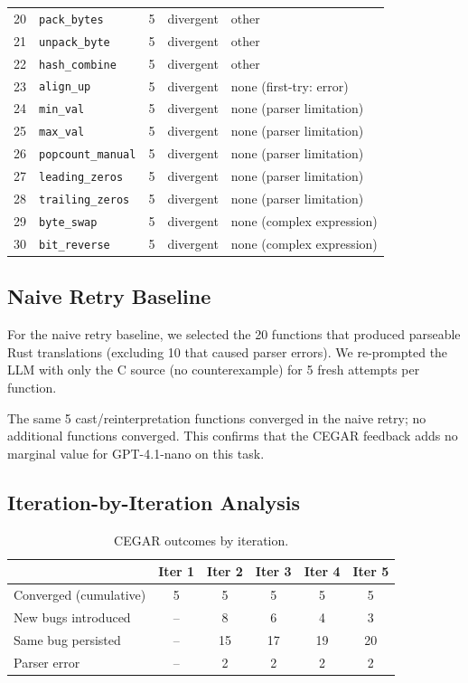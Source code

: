 \documentclass[11pt]{article}
\begin{document}
\begin{table}[H]
\begin{tabular}{@{}rlccl@{}}
20 & \texttt{pack\_bytes}        & 5 & divergent & other \\
21 & \texttt{unpack\_byte}       & 5 & divergent & other \\
22 & \texttt{hash\_combine}      & 5 & divergent & other \\
23 & \texttt{align\_up}          & 5 & divergent & none (first-try: error) \\
24 & \texttt{min\_val}           & 5 & divergent & none (parser limitation) \\
25 & \texttt{max\_val}           & 5 & divergent & none (parser limitation) \\
26 & \texttt{popcount\_manual}   & 5 & divergent & none (parser limitation) \\
27 & \texttt{leading\_zeros}     & 5 & divergent & none (parser limitation) \\
28 & \texttt{trailing\_zeros}    & 5 & divergent & none (parser limitation) \\
29 & \texttt{byte\_swap}         & 5 & divergent & none (complex expression) \\
30 & \texttt{bit\_reverse}       & 5 & divergent & none (complex expression) \\
\bottomrule
\end{tabular}
\end{table}

\subsection{Naive Retry Baseline}

For the naive retry baseline, we selected the 20 functions that produced
parseable Rust translations (excluding 10 that caused parser errors).
We re-prompted the LLM with only the C source (no counterexample) for
5 fresh attempts per function.

The same 5 cast/reinterpretation functions converged in the naive retry;
no additional functions converged.  This confirms that the CEGAR feedback
adds no marginal value for GPT-4.1-nano on this task.

\subsection{Iteration-by-Iteration Analysis}

\begin{table}[H]
\centering
\caption{CEGAR outcomes by iteration.}\label{tab:iter-analysis}
\begin{tabular}{@{}lccccc@{}}
\toprule
& \textbf{Iter 1} & \textbf{Iter 2} & \textbf{Iter 3} &
\textbf{Iter 4} & \textbf{Iter 5} \\
\midrule
Converged (cumulative) & 5 & 5 & 5 & 5 & 5 \\
New bugs introduced    & -- & 8 & 6 & 4 & 3 \\
Same bug persisted     & -- & 15 & 17 & 19 & 20 \\
Parser error           & -- & 2 & 2 & 2 & 2 \\
\bottomrule
\end{tabular}
\end{table}
\end{document}
